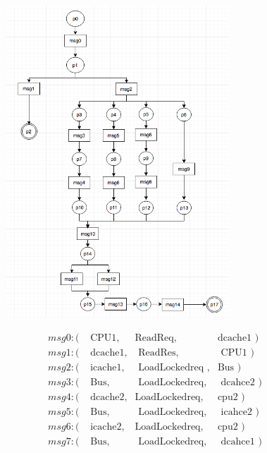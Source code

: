 \documentclass[12pt,frontmatter,copyright,thesis]{usfmanus}
\begin{document}
\begin{appendix}
 \begin{figure}[h] 
 \centerline{
 \includegraphics[width=3.3in]{figures/readDcache.png}}
 \begin{minipage}{.5\textwidth}
 {\footnotesize
 \[
 \begin{array}{llll}
 msg0: (&\mbox{ CPU1},&\mbox{ReadReq},&\mbox{dcache1  })\\                   
 msg1: (&\mbox{ dcache1},&\mbox{ ReadRes},&\mbox{ CPU1 })\\
 msg2: (&\mbox{ icache1},&\mbox{ LoadLockedreq },&\mbox{Bus })\\     
 msg3: (&\mbox{ Bus},&\mbox{ LoadLockedreq},&\mbox{ dcahce2     })\\
 msg4: (&\mbox{ dcache2},&\mbox{LoadLockedreq},&\mbox{cpu2 })\\
 msg5: (&\mbox{ Bus},&\mbox{ LoadLockedreq},&\mbox{ icahce2     })\\ 
 msg6: (&\mbox{ icache2},&\mbox{LoadLockedreq},&\mbox{cpu2     })\\
 msg7: (&\mbox{ Bus},&\mbox{ LoadLockedreq},&\mbox{ dcahce1 })

 \end{array}
 \]}
 \end{minipage}\hfill%
  \hfill\begin{minipage}{.5\textwidth}
 

\end{minipage}
\end{figure}
\end{appendix}
\end{document}
